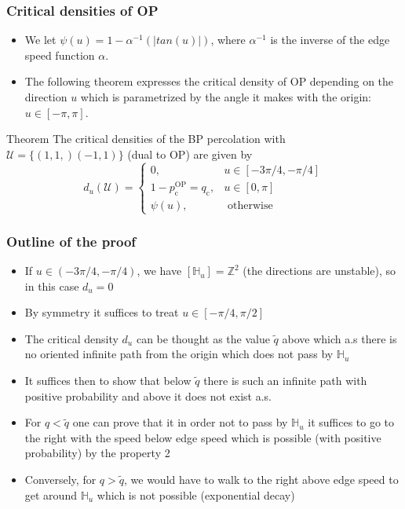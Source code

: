 \begin{frame}
	\frametitle{Critical densities of OP}
	\begin{itemize}
		\item We let $\psi (u) = 1 - \alpha^{-1}(|tan(u)|)$, where $\alpha^{-1}$ is the inverse of the edge speed function $\alpha$.
		\item The following theorem expresses the critical density of OP depending on the direction $u$ which is parametrized by the angle it makes with the origin: $u \in [- \pi, \pi]$.
	\end{itemize}
	\begin{block}{Theorem}
		The critical densities of the BP percolation with $\mathcal{U} = \{(1, 1,) (-1, 1)\}$ (dual to OP) are given by
		\begin{equation}
			d_{u}(\mathcal{U})= \begin{cases}0, & u \in[-3 \pi / 4,-\pi / 4] \\ 1-p_{\mathrm{c}}^{\mathrm{OP}}=q_{\mathrm{c}}, & u \in[0, \pi] \\ \psi(u), & \text { otherwise }\end{cases}
		\end{equation}
	\end{block}
\end{frame}

\begin{frame}
	\frametitle{Outline of the proof}
	\begin{itemize}
		\item If $u \in (-3\pi/4, -\pi/4)$, we have $[\mathbb{H}_{u}] = \mathbb{Z}^{2}$ (the directions are unstable), so in this case $d_{u} = 0$
		\item By symmetry it suffices to treat $u \in [-\pi/4, \pi/2]$
		\item The critical density $d_{u}$ can be thought as the value $\tilde{q}$ above which a.s there is no oriented infinite path from the origin which does not pass by $\mathbb{H}_{u}$
		\item It suffices then to show that below $\tilde{q}$ there is such an infinite path with positive probability and above it does not exist a.s.
		\item For $q < \tilde q$ one can prove that it in order not to pass by $\mathbb{H}_{u}$ it suffices to go to the right with the speed below edge speed which is possible (with positive probability) by the property 2
		\item Conversely, for $q > \tilde{q}$, we would have to walk to the right above edge speed to get around $\mathbb{H}_{u}$ which is not possible (exponential decay) 
	\end{itemize}
\end{frame}

